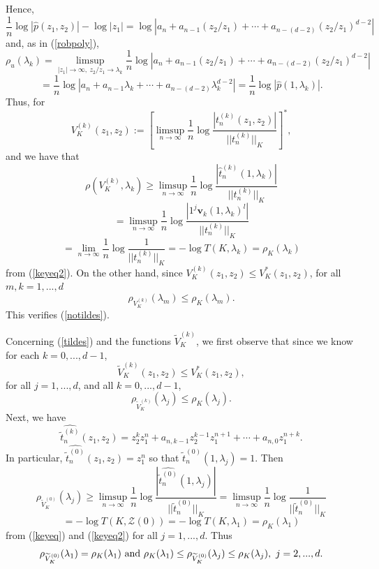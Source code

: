 \documentclass[12pt]{article}
\numberwithin{equation}{section}
\renewcommand{\hat}{\widehat}
\renewcommand{\tilde}{\widetilde}
\newcommand{\calZ}{\mathcal{Z}}
\newcommand{\bv}{\mathbf{v}}
\begin{document}
Hence,
$$\frac{1}{n}\log |\hat p(z_1,z_2)|-\log |z_1| = \log|a_n +a_{n-1}(z_2/z_1) + \cdots + a_{n-(d-2)}(z_2/z_1)^{d-2}|$$ and, as in (\ref{robpoly}), 
$$\rho_u(\lambda_k)=\limsup_{|z_1|\to \infty, \ z_2/z_1\to \lambda_k} \frac{1}{n}\log|a_n +a_{n-1}(z_2/z_1) + \cdots + a_{n-(d-2)}(z_2/z_1)^{d-2}|$$
$$=\frac{1}{n}\log|a_n +a_{n-1}\lambda_k + \cdots + a_{n-(d-2)}\lambda_k^{d-2}|=\frac{1}{n}\log|\hat p(1,\lambda_k)|.$$
Thus, for
$$V_K^{(k)}(z_1,z_2):=[\limsup_{n\to \infty} \frac{1}{n}\log \frac{| t_n^{(k)}(z_1,z_2)|}{||t_n^{(k)}||_K}]^*,$$
and we have that
$$\rho(V_K^{(k)},\lambda_k)\geq \limsup_{n\to \infty} \frac{1}{n}\log \frac{| \hat t_n^{(k)}(1,\lambda_k)|}{||t_n^{(k)}||_K}$$
$$=\limsup_{n\to \infty} \frac{1}{n}\log \frac{| 1^j \bv_k(1,\lambda_k)^l|}{||t_n^{(k)}||_K}$$
$$=\lim_{n\to \infty} \frac{1}{n}\log \frac{1}{||t_n^{(k)}||_K}=-\log T(K,\lambda_k)= \rho_K(\lambda_k)$$
from (\ref{keyeq2}). On the other hand, since $V_K^{(k)}(z_1,z_2)\leq V_K^*(z_1,z_2)$, 
for all $m,k=1,...,d$
$$\rho_{V_{K}^{(k)}}(\lambda_{m})\leq \rho_K(\lambda_{m}).$$ 
This verifies (\ref{notildes}).

Concerning (\ref{tildes}) and the functions $\tilde V_{K}^{(k)}$, we first observe that
since we know for each $k=0,...,d-1$, 
$$\tilde V_{K}^{(k)}(z_1,z_2)\leq V_K^*(z_1,z_2),$$
for all $j=1,...,d$, and all $k=0,...,d-1$, 
$$\rho_{\tilde V_{K}^{(k)}}(\lambda_{j})\leq \rho_K(\lambda_{j}).$$
Next, we have 
\begin{equation}\label{hateqn} \hat {\tilde t_{n}^{(k)}}(z_1,z_2)=z_2^k z_1^n+a_{n,k-1}z_2^{k-1}z_1^{n+1} +\cdots +a_{n,0}z_1^{n+k}.\end{equation} 
In particular, 
$\hat {\tilde t_{n}^{(0)}}(z_1,z_2)=z_1^n$ so that 
$\hat {\tilde t_{n}^{(0)}}(1,\lambda_j)=1$. 
Then
$$\rho_{\tilde V_{K}^{(0)}}(\lambda_{j})\geq \limsup_{n\to \infty} \frac{1}{n}\log \frac{|\hat {\tilde t_{n}^{(0)}}(1,\lambda_j)|}{||\tilde t_{n}^{(0)}||_K}=\limsup_{n\to \infty} \frac{1}{n}\log \frac{1}{||\tilde t_{n}^{(0)}||_K}$$
$$=-\log T(K,\calZ(0))=-\log T(K,\lambda_{1})= \rho_K(\lambda_{1})$$
from (\ref{keyeq}) and (\ref{keyeq2}) for all $j=1,...,d$. Thus 
$$\rho_{\tilde V_{K}^{(0)}}(\lambda_{1})=\rho_K(\lambda_{1}) \ \hbox{and}  \ \rho_K(\lambda_{1})\leq \rho_{\tilde V_{K}^{(0)}}(\lambda_{j})\leq  \rho_K(\lambda_{j}), \ j=2,...,d.$$ 
\end{document}
